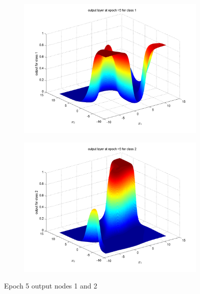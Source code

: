 \documentclass{article}
\begin{document}
\begin{figure}
\begin{subfigure}{.5\textwidth}
  \centering
  \includegraphics[width=.8\linewidth]{Classification/overlapping/5_1}
 
\end{subfigure}%
\begin{subfigure}{.5\textwidth}
  \centering
  \includegraphics[width=.8\linewidth]{Classification/overlapping/5_2}
  \end{subfigure}
\caption{Epoch 5 output nodes 1 and 2}
\end{figure}
\end{document}
